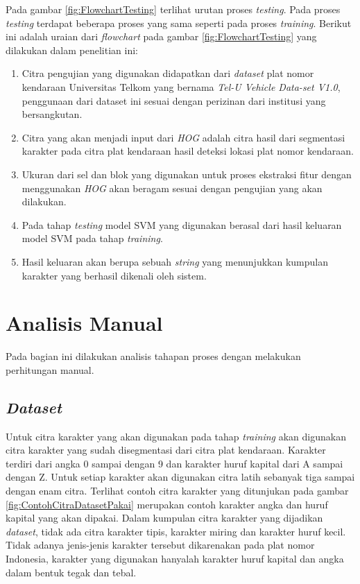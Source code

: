 \noindent Pada gambar \ref{fig:FlowchartTesting} terlihat urutan proses \textit{testing}. Pada proses \textit{testing} terdapat beberapa proses yang sama seperti pada proses \textit{training}. Berikut ini adalah uraian dari \textit{flowchart} pada gambar \ref{fig:FlowchartTesting} yang dilakukan dalam penelitian ini:
\begin{enumerate}
\item Citra pengujian yang digunakan didapatkan dari \textit{dataset} plat nomor kendaraan Universitas Telkom yang bernama \textit{Tel-U Vehicle Data-set V1.0}, penggunaan dari dataset ini sesuai dengan perizinan dari institusi yang bersangkutan.
\item Citra yang akan menjadi input dari \textit{HOG} adalah citra hasil dari segmentasi karakter pada citra plat kendaraan hasil deteksi lokasi plat nomor kendaraan.
\item Ukuran dari sel dan blok yang digunakan untuk proses ekstraksi fitur dengan menggunakan \textit{HOG} akan beragam sesuai dengan pengujian yang akan dilakukan.
\item Pada tahap \textit{testing} model SVM yang digunakan berasal dari hasil keluaran model SVM pada tahap \textit{training}.
\item Hasil keluaran akan berupa sebuah \textit{string} yang menunjukkan kumpulan karakter yang berhasil dikenali oleh sistem.\\
\end{enumerate}

\section{Analisis Manual}
\noindent Pada bagian ini dilakukan analisis tahapan proses dengan melakukan perhitungan manual.\\

\subsection{\textit{Dataset}}
\noindent Untuk citra karakter yang akan digunakan pada tahap \textit{training} akan digunakan citra karakter yang sudah disegmentasi dari citra plat kendaraan. Karakter terdiri dari angka 0 sampai dengan 9 dan karakter huruf kapital dari A sampai dengan Z. Untuk setiap karakter akan digunakan citra latih sebanyak tiga sampai dengan enam citra. Terlihat contoh citra karakter yang ditunjukan pada gambar \ref{fig:ContohCitraDatasetPakai} merupakan contoh karakter angka dan huruf kapital yang akan dipakai. Dalam kumpulan citra karakter yang dijadikan \textit{dataset}, tidak ada citra karakter tipis, karakter miring dan karakter huruf kecil. Tidak adanya jenis-jenis karakter tersebut dikarenakan pada plat nomor Indonesia, karakter yang digunakan hanyalah karakter huruf kapital dan angka dalam bentuk tegak dan tebal.

